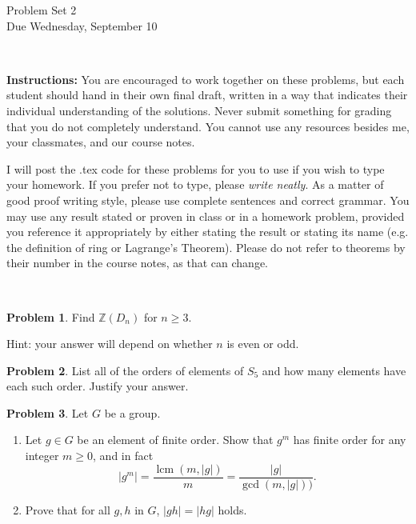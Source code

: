 \documentclass[11pt]{article}
\title{}
\date{\vspace{-0.5in}}
\DeclareMathOperator{\lcm}{lcm}
\newcommand{\Z}{\mathbb{Z}}
\theoremstyle{definition}
\newtheorem{problem}{Problem}
\begin{document}
\thispagestyle{fancy}
\pagestyle{fancy}

\vspace{3em}

\begin{center}
	{\LARGE Problem Set 2 \\}
	Due Wednesday, September 10
\end{center}

\

\noindent
{\bf Instructions:}
You are encouraged to work together on these problems, but each student should hand in their own final draft, written in a way that indicates their individual understanding of the solutions. Never submit something for grading that you do not completely understand. You cannot use any resources besides me, your classmates, and our course notes.


I will post the .tex code for these problems for you to use if you wish to type your homework. If you prefer not to type, please  {\em write neatly}. As a matter of good proof writing style, please use complete sentences and correct grammar. You may use any result stated or proven in class or in a homework problem, provided you reference it appropriately by either stating the result or stating its name (e.g. the definition of ring or Lagrange's Theorem). Please do not refer to theorems by their number in the course notes, as that can change.


\


\begin{problem}
Find $\Z(D_{n})$ for $n \geqslant 3$.  

\noindent Hint: your answer will depend on whether $n$ is even or odd.
\end{problem}

\begin{problem}
List all of the orders of elements of $S_5$ and how many elements have each such order. Justify your answer.
\end{problem}


\begin{problem} Let $G$ be a group.
 \begin{enumerate}
\item Let $g \in G$ be an element of finite order. Show that $g^m$ has finite order for any integer $m \geq 0$, and in fact
\[
|g^m| = \frac{\lcm(m,|g|)}{m} = \frac{|g|}{\gcd(m, |g|))}.
\]
\item Prove that for all $g, h$ in  $G$, $|gh| = |hg|$ holds.
\end{enumerate}
\end{problem}
\end{document}
